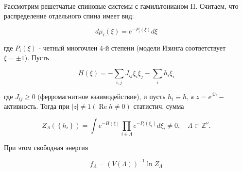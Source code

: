 \documentclass[10pt]{article}
\begin{document}
Рассмотрим решетчатые спиновые системы с гамильтонианом $\mathrm{H}$. Считаем, что распределение отдельного спина имеет вид:



\[

d \mu_{i}(\xi)=e^{-P_{i}(\xi)} d \xi

\]



где $P_{i}(\xi)$ - четный многочлен 4-й степени (модели Изинга соответствует $\xi= \pm 1)$. Пусть



\[

H(\xi)=-\sum_{i, j} J_{i j} \xi_{i} \xi_{j}-\sum_{i} h_{i} \xi_{i}

\]



где $J_{i j} \geqslant 0$ (ферромагнитное взаимодействие), и пусть $h_{i} \equiv h$, а $z=e^{\beta h}-$ активность. Тогда при $|z| \neq 1(\operatorname{Re} h \neq 0)$ статистич. сумма



\[

Z_{\Lambda}\left(\left\{h_{i}\right\}\right)=\int e^{-H(\xi)} \prod_{i \in \Lambda} e^{-P_{i}\left(\xi_{i}\right)} d \xi_{i} \neq 0, \quad \Lambda \subset \mathbb{Z}^{\nu} .

\]



При этом свободная энергия



\[

f_{\Lambda}=(V(\Lambda))^{-1} \ln Z_{\Lambda}

\]
\end{document}
